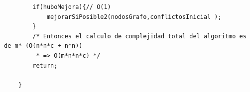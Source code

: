 \documentclass[a4paper]{article}
\begin{document}
\begin{lstlisting}
		if(huboMejora){// O(1)
			mejorarSiPosible2(nodosGrafo,conflictosInicial );
		}
		/* Entonces el calculo de complejidad total del algoritmo es de m* (O(n*n*c + n*n)) 
		 * => O(m*n*n*c) */
		return;
		
	}

\end{lstlisting}

\vspace*{0.5cm}
\end{document}
